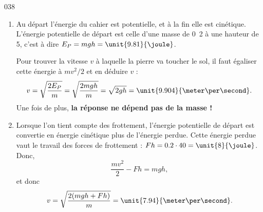 

\begin{corrige}{038}
\begin{enumerate}

\item Au départ l'énergie du cahier est potentielle, et à la fin elle est cinétique. L'énergie potentielle de départ est celle d'une masse de \unit{0.2}{\kilo\gram} à une hauteur de \unit{5}{\meter}, c'est à dire $E_P=mgh=\unit{9.81}{\joule}$. 

Pour trouver la vitesse $v$ à laquelle la pierre va toucher le sol, il faut égaliser cette énergie à $mv^2/2$ et en déduire $v$ :
\[ 
  v=\sqrt{ \frac{ 2E_P }{ m } }=\sqrt{\frac{ 2mgh }{ m }}=\sqrt{2gh}=\unit{9.904}{\meter\per\second}.
\]
Une fois de plus, {\bf la réponse ne dépend  pas de la masse !}


\item  Lorsque l'on tient compte des frottement, l'énergie potentielle de départ est convertie en énergie cinétique plus de l'énergie perdue. Cette énergie perdue vaut le travail des forces de frottement : $Fh=0.2\cdot 40=\unit{8}{\joule}$. Donc,
\[ 
  \frac{ mv^2 }{ 2 }-Fh=mgh,
\]
et donc
\[ 
  v=\sqrt{  \frac{ 2(mgh+Fh) }{ m }  }=\unit{7.94}{ \meter\per\second}.
\]

\end{enumerate}


\end{corrige}

